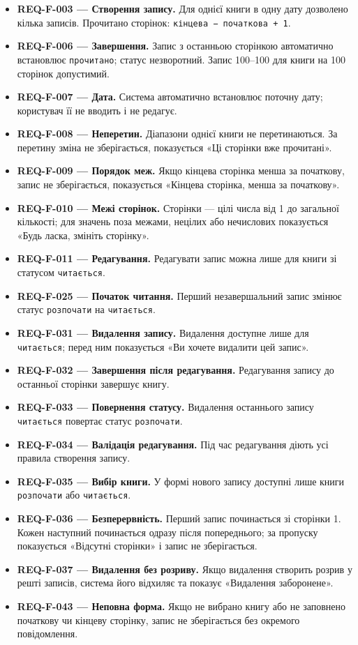 \documentclass[
]{article}
\providecommand{\tightlist}{%
  \setlength{\itemsep}{0pt}\setlength{\parskip}{0pt}}
\begin{document}
\begin{itemize}
\tightlist
\item
  \textbf{REQ-F-003 --- Створення запису.} Для однієї книги в одну дату
  дозволено кілька записів. Прочитано сторінок:
  \texttt{кінцева\ −\ початкова\ +\ 1}.
\item
  \textbf{REQ-F-006 --- Завершення.} Запис з останньою сторінкою
  автоматично встановлює \texttt{прочитано}; статус незворотний. Запис
  100--100 для книги на 100 сторінок допустимий.
\item
  \textbf{REQ-F-007 --- Дата.} Система автоматично встановлює поточну
  дату; користувач її не вводить і не редагує.
\item
  \textbf{REQ-F-008 --- Неперетин.} Діапазони однієї книги не
  перетинаються. За перетину зміна не зберігається, показується «Ці
  сторінки вже прочитані».
\item
  \textbf{REQ-F-009 --- Порядок меж.} Якщо кінцева сторінка менша за
  початкову, запис не зберігається, показується «Кінцева сторінка, менша
  за початкову».
\item
  \textbf{REQ-F-010 --- Межі сторінок.} Сторінки --- цілі числа від 1 до
  загальної кількості; для значень поза межами, нецілих або нечислових
  показується «Будь ласка, змініть сторінку».
\item
  \textbf{REQ-F-011 --- Редагування.} Редагувати запис можна лише для
  книги зі статусом \texttt{читається}.
\item
  \textbf{REQ-F-025 --- Початок читання.} Перший незавершальний запис
  змінює статус \texttt{розпочати} на \texttt{читається}.
\item
  \textbf{REQ-F-031 --- Видалення запису.} Видалення доступне лише для
  \texttt{читається}; перед ним показується «Ви хочете видалити цей
  запис».
\item
  \textbf{REQ-F-032 --- Завершення після редагування.} Редагування
  запису до останньої сторінки завершує книгу.
\item
  \textbf{REQ-F-033 --- Повернення статусу.} Видалення останнього запису
  \texttt{читається} повертає статус \texttt{розпочати}.
\item
  \textbf{REQ-F-034 --- Валідація редагування.} Під час редагування
  діють усі правила створення запису.
\item
  \textbf{REQ-F-035 --- Вибір книги.} У формі нового запису доступні
  лише книги \texttt{розпочати} або \texttt{читається}.
\item
  \textbf{REQ-F-036 --- Безперервність.} Перший запис починається зі
  сторінки 1. Кожен наступний починається одразу після попереднього; за
  пропуску показується «Відсутні сторінки» і запис не зберігається.
\item
  \textbf{REQ-F-037 --- Видалення без розриву.} Якщо видалення створить
  розрив у решті записів, система його відхиляє та показує «Видалення
  заборонене».
\item
  \textbf{REQ-F-043 --- Неповна форма.} Якщо не вибрано книгу або не
  заповнено початкову чи кінцеву сторінку, запис не зберігається без
  окремого повідомлення.
\end{itemize}
\end{document}
